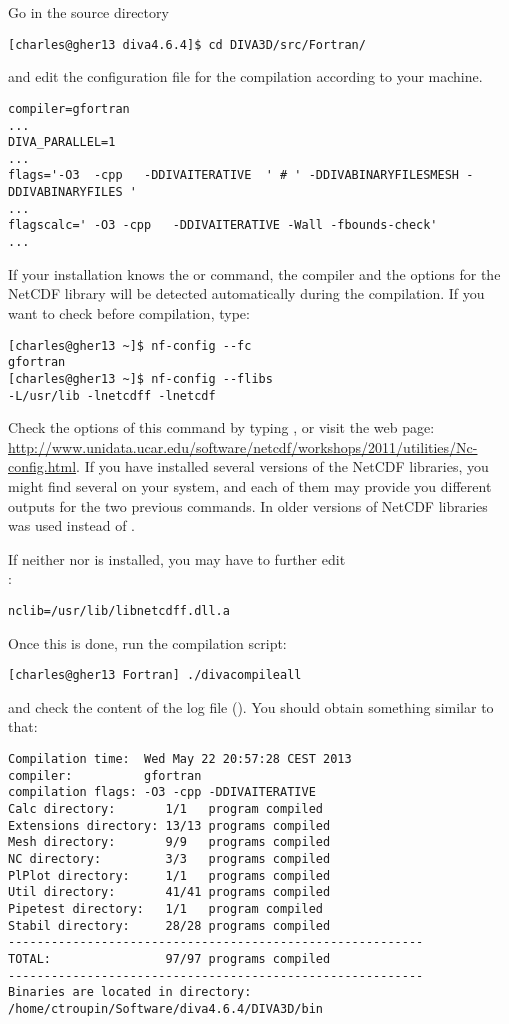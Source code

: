 Go in the source directory 
\begin{lstlisting}[style=Bash]
[charles@gher13 diva4.6.4]$ cd DIVA3D/src/Fortran/
\end{lstlisting}
and edit the configuration file  for the compilation according to your machine. 

\begin{verbatim}
compiler=gfortran
...
DIVA_PARALLEL=1
...
flags='-O3  -cpp   -DDIVAITERATIVE  ' # ' -DDIVABINARYFILESMESH -DDIVABINARYFILES '
...
flagscalc=' -O3 -cpp   -DDIVAITERATIVE -Wall -fbounds-check'
...
\end{verbatim}

If your installation knows the  or  command, the compiler and the options for the NetCDF  library will be detected automatically during the compilation. If you want to check before compilation, type:
\begin{lstlisting}[style=Bash]
[charles@gher13 ~]$ nf-config --fc
gfortran
[charles@gher13 ~]$ nf-config --flibs
-L/usr/lib -lnetcdff -lnetcdf
\end{lstlisting}
Check the options of this command by typing , or visit the web page: \url{http://www.unidata.ucar.edu/software/netcdf/workshops/2011/utilities/Nc-config.html}. If you have installed several versions of the NetCDF libraries, you might find several  on your system, and each of them may provide you different outputs for the two previous commands. In older versions of NetCDF libraries  was used instead of .

If neither  nor  is installed, you may have to further edit\\ 
:
\begin{verbatim}
nclib=/usr/lib/libnetcdff.dll.a
\end{verbatim}

Once this is done, run the compilation script: 
\begin{lstlisting}[style=Bash]
[charles@gher13 Fortran] ./divacompileall
\end{lstlisting}
and check the content of the log file (). You should obtain something similar to that:
\begin{verbatim}
Compilation time:  Wed May 22 20:57:28 CEST 2013
compiler:          gfortran
compilation flags: -O3 -cpp -DDIVAITERATIVE
Calc directory:       1/1   program compiled
Extensions directory: 13/13 programs compiled
Mesh directory:       9/9   programs compiled
NC directory:         3/3   programs compiled
PlPlot directory:     1/1   programs compiled
Util directory:       41/41 programs compiled
Pipetest directory:   1/1   program compiled
Stabil directory:     28/28 programs compiled
----------------------------------------------------------
TOTAL:                97/97 programs compiled
----------------------------------------------------------
Binaries are located in directory:
/home/ctroupin/Software/diva4.6.4/DIVA3D/bin
\end{verbatim}

